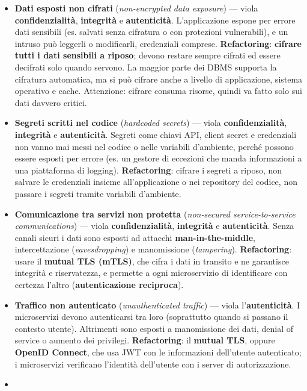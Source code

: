 \begin{itemize}
\item
  \textbf{Dati esposti non cifrati} (\emph{non-encrypted data exposure})
  --- viola \textbf{confidenzialità}, \textbf{integrità} e
  \textbf{autenticità}. L'applicazione espone per errore dati sensibili
  (es. salvati senza cifratura o con protezioni vulnerabili), e un
  intruso può leggerli o modificarli, credenziali comprese.
  \textbf{Refactoring}: \textbf{cifrare tutti i dati sensibili a
  riposo}; devono restare sempre cifrati ed essere decifrati solo quando
  servono. La maggior parte dei DBMS supporta la cifratura automatica,
  ma si può cifrare anche a livello di applicazione, sistema operativo e
  cache. Attenzione: cifrare consuma risorse, quindi va fatto solo sui
  dati davvero critici.
\item
  \textbf{Segreti scritti nel codice} (\emph{hardcoded secrets}) ---
  viola \textbf{confidenzialità}, \textbf{integrità} e
  \textbf{autenticità}. Segreti come chiavi API, client secret e
  credenziali non vanno mai messi nel codice o nelle variabili
  d'ambiente, perché possono essere esposti per errore (es. un gestore
  di eccezioni che manda informazioni a una piattaforma di logging).
  \textbf{Refactoring}: cifrare i segreti a riposo, non salvare le
  credenziali insieme all'applicazione o nei repository del codice, non
  passare i segreti tramite variabili d'ambiente.
\item
  \textbf{Comunicazione tra servizi non protetta} (\emph{non-secured
  service-to-service communications}) --- viola
  \textbf{confidenzialità}, \textbf{integrità} e \textbf{autenticità}.
  Senza canali sicuri i dati sono esposti ad attacchi
  \textbf{man-in-the-middle}, intercettazione (\emph{eavesdropping}) e
  manomissione (\emph{tampering}). \textbf{Refactoring}: usare il
  \textbf{mutual TLS (mTLS)}, che cifra i dati in transito e ne
  garantisce integrità e riservatezza, e permette a ogni microservizio
  di identificare con certezza l'altro (\textbf{autenticazione
  reciproca}).
\item
  \textbf{Traffico non autenticato} (\emph{unauthenticated traffic}) ---
  viola l'\textbf{autenticità}. I microservizi devono autenticarsi tra
  loro (soprattutto quando si passano il contesto utente). Altrimenti
  sono esposti a manomissione dei dati, denial of service o aumento dei
  privilegi. \textbf{Refactoring}: il \textbf{mutual TLS}, oppure
  \textbf{OpenID Connect}, che usa JWT con le informazioni dell'utente
  autenticato; i microservizi verificano l'identità dell'utente con i
  server di autorizzazione.
\item

\end{itemize}
